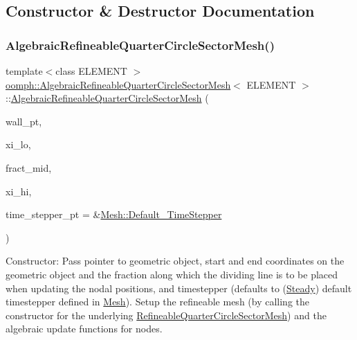 \subsection{Constructor \& Destructor Documentation}
\mbox{\label{classoomph_1_1AlgebraicRefineableQuarterCircleSectorMesh_a4245d6f0499af21053a0381bc69de271}} 
\subsubsection{\texorpdfstring{Algebraic\+Refineable\+Quarter\+Circle\+Sector\+Mesh()}{AlgebraicRefineableQuarterCircleSectorMesh()}}
{\footnotesize\ttfamily template$<$class E\+L\+E\+M\+E\+NT $>$ \\
\hyperlink{classoomph_1_1AlgebraicRefineableQuarterCircleSectorMesh}{oomph\+::\+Algebraic\+Refineable\+Quarter\+Circle\+Sector\+Mesh}$<$ E\+L\+E\+M\+E\+NT $>$\+::\hyperlink{classoomph_1_1AlgebraicRefineableQuarterCircleSectorMesh}{Algebraic\+Refineable\+Quarter\+Circle\+Sector\+Mesh} (\begin{DoxyParamCaption}\item[{\hyperlink{classoomph_1_1GeomObject}{Geom\+Object} $\ast$}]{wall\+\_\+pt,  }\item[{const double \&}]{xi\+\_\+lo,  }\item[{const double \&}]{fract\+\_\+mid,  }\item[{const double \&}]{xi\+\_\+hi,  }\item[{\hyperlink{classoomph_1_1TimeStepper}{Time\+Stepper} $\ast$}]{time\+\_\+stepper\+\_\+pt = {\ttfamily \&\hyperlink{classoomph_1_1Mesh_a12243d0fee2b1fcee729ee5a4777ea10}{Mesh\+::\+Default\+\_\+\+Time\+Stepper}} }\end{DoxyParamCaption})\hspace{0.3cm}{\ttfamily [inline]}}



Constructor\+: Pass pointer to geometric object, start and end coordinates on the geometric object and the fraction along which the dividing line is to be placed when updating the nodal positions, and timestepper (defaults to (\hyperlink{classoomph_1_1Steady}{Steady}) default timestepper defined in \hyperlink{classoomph_1_1Mesh}{Mesh}). Setup the refineable mesh (by calling the constructor for the underlying \hyperlink{classoomph_1_1RefineableQuarterCircleSectorMesh}{Refineable\+Quarter\+Circle\+Sector\+Mesh}) and the algebraic update functions for nodes. 



